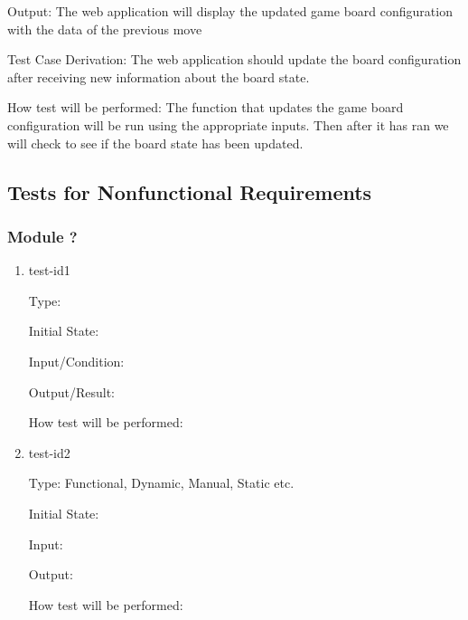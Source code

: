 \documentclass[12pt, titlepage]{article}
\begin{document}
\begin{enumerate}
    Output: The web application will display the updated game board configuration with the data
    of the previous move
                        
    Test Case Derivation: The web application should update the board configuration after receiving new information about the board state. 

    How test will be performed: The function that updates the game board configuration
    will be run using the appropriate inputs. Then after it has ran we will check to see if the board state has been updated.

  \end{enumerate}


\subsection{Tests for Nonfunctional Requirements}



\subsubsection{Module ?}
		
\begin{enumerate}

\item{test-id1\\}

Type: 
					
Initial State: 
					
Input/Condition: 
					
Output/Result: 
					
How test will be performed: 
					
\item{test-id2\\}

Type: Functional, Dynamic, Manual, Static etc.
					
Initial State: 
					
Input: 
					
Output: 
					
How test will be performed: 

\end{enumerate}
\end{document}

